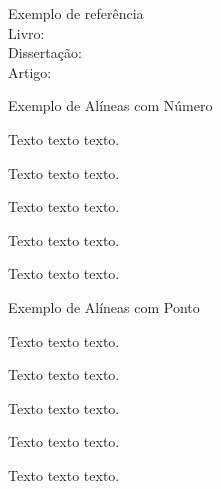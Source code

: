 \begin{quadro}[!h]	
\centering
{}		
\end{quadro}

\begin{center}
Exemplo de referência \\
Livro: \cite{knuth} \\ Dissertação: \cite{Maia2011} \\ Artigo: \cite{lamport1986latex} 
\end{center}


\newpage

\begin{center}
Exemplo de Alíneas com Número  
\end{center}
\begin{alineascomnumero}
\item Texto texto texto.
\item Texto texto texto.
\item Texto texto texto.
\item Texto texto texto.
\item Texto texto texto.
\end{alineascomnumero}

\begin{center}
Exemplo de Alíneas com Ponto  
\end{center}
\begin{alineascomponto}
\item Texto texto texto.
\item Texto texto texto.
\item Texto texto texto.
\begin{subalineascomponto}
\item Texto texto texto.
\item Texto texto texto.
\end{subalineascomponto}
\end{alineascomponto}